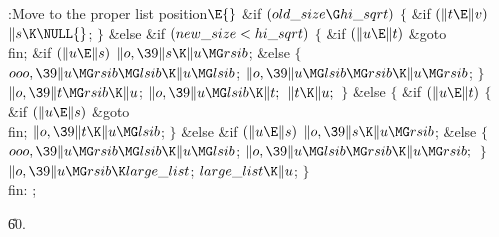 \Y\B\4:Move  to the proper list position\X${}\E{}$\6
\&{if} ${}(\\{old\_size}\G\\{hi\_sqrt}){}$\5
${}\{{}$\1\6
\&{if} ${}(\|t\E\|v){}$\1\5
${}\|s\K\NULL{}$;\2\6
\4${}\}{}$\5
\2\&{else} \&{if} ${}(\\{new\_size}<\\{hi\_sqrt}){}$\5
${}\{{}$\1\6
\&{if} ${}(\|u\E\|t){}$\1\5
\&{goto} \\{fin};\2\6
\&{if} ${}(\|u\E\|s){}$\1\5
${}\|o,\39\|s\K\|u\MG\\{rsib}{}$;\2\6
\&{else}\5
${}\{{}$\1\6
${}\\{ooo},\39\|u\MG\\{rsib}\MG\\{lsib}\K\|u\MG\\{lsib}{}$;\6
${}\|o,\39\|u\MG\\{lsib}\MG\\{rsib}\K\|u\MG\\{rsib}{}$;\6
\4${}\}{}$\2\6
${}\|o,\39\|t\MG\\{rsib}\K\|u{}$;\6
${}\|o,\39\|u\MG\\{lsib}\K\|t;{}$\6
${}\|t\K\|u;{}$\6
\4${}\}{}$\5
\2\&{else}\5
${}\{{}$\1\6
\&{if} ${}(\|u\E\|t){}$\5
${}\{{}$\1\6
\&{if} ${}(\|u\E\|s){}$\1\5
\&{goto} \\{fin};\2\6
${}\|o,\39\|t\K\|u\MG\\{lsib}{}$;\6
\4${}\}{}$\5
\2\&{else} \&{if} ${}(\|u\E\|s){}$\1\5
${}\|o,\39\|s\K\|u\MG\\{rsib}{}$;\2\6
\&{else}\5
${}\{{}$\1\6
${}\\{ooo},\39\|u\MG\\{rsib}\MG\\{lsib}\K\|u\MG\\{lsib}{}$;\6
${}\|o,\39\|u\MG\\{lsib}\MG\\{rsib}\K\|u\MG\\{rsib};{}$\6
\4${}\}{}$\2\6
${}\|o,\39\|u\MG\\{rsib}\K\\{large\_list}{}$;\5
${}\\{large\_list}\K\|u{}$;\6
\4${}\}{}$\2\6
\4\\{fin}:\5
;\par
\U60.\fi

